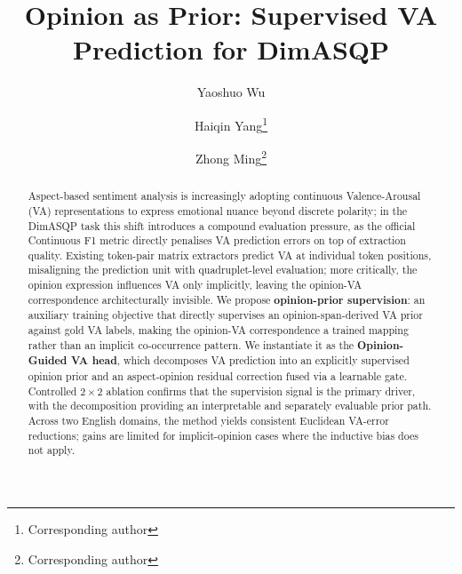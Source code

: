 \documentclass[runningheads]{llncs}
\begin{document}
\title{Opinion as Prior: Supervised VA Prediction for DimASQP}

\author{Yaoshuo Wu \and Haiqin Yang\thanks{Corresponding author} \and Zhong Ming\thanks{Corresponding author}}

\maketitle

\begin{abstract}
Aspect-based sentiment analysis is increasingly adopting continuous Valence-Arousal (VA) representations to express emotional nuance beyond discrete polarity; in the DimASQP task this shift introduces a compound evaluation pressure, as the official Continuous F1 metric directly penalises VA prediction errors on top of extraction quality. Existing token-pair matrix extractors predict VA at individual token positions, misaligning the prediction unit with quadruplet-level evaluation; more critically, the opinion expression influences VA only implicitly, leaving the opinion-VA correspondence architecturally invisible. We propose \textbf{opinion-prior supervision}: an auxiliary training objective that directly supervises an opinion-span-derived VA prior against gold VA labels, making the opinion-VA correspondence a trained mapping rather than an implicit co-occurrence pattern. We instantiate it as the \textbf{Opinion-Guided VA head}, which decomposes VA prediction into an explicitly supervised opinion prior and an aspect-opinion residual correction fused via a learnable gate. Controlled $2{\times}2$ ablation confirms that the supervision signal is the primary driver, with the decomposition providing an interpretable and separately evaluable prior path. Across two English domains, the method yields consistent Euclidean VA-error reductions; gains are limited for implicit-opinion cases where the inductive bias does not apply.

\end{abstract}
\end{document}
